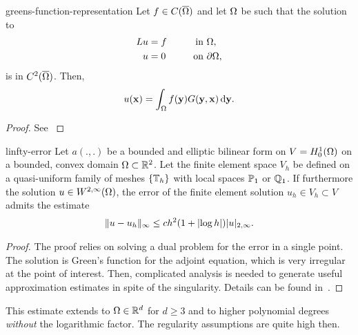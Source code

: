 \begin{Theorem}{greens-function-representation}
  Let $f\in C(\overline\domain)$ and let $\domain$ be such that the
  solution to
  \begin{gather}
    \begin{aligned}
      Lu &= f &\qquad\text{in }&\domain,\\
      u &= 0 &\text{on }&\d\domain,
    \end{aligned}
  \end{gather}
  is in $C^2(\overline\domain)$. Then,
  \begin{gather}
    u(\vx) = \int_\domain f(\vy)G(\vy,\vx)\dvy.
  \end{gather}
\end{Theorem}

\begin{proof}
  See \cite[Section 2.2]{Evans98}
\end{proof}

\begin{Theorem}{linfty-error}
  Let $a(.,.)$ be a bounded and elliptic bilinear form on
  $V = H^1_0(\domain)$ on a bounded, convex domain $\domain\subset \R^2$. Let the
  finite element space $V_h$ be defined on a quasi-uniform family of
  meshes $\{\mesh_h\}$ with local spaces $\P_1$ or $\Q_1$. If
  furthermore the solution $u\in W^{2,\infty}(\domain)$, the error of
  the finite element solution $u_h\in V_h \subset V$ admits the
  estimate
  \begin{gather}
    \norm{u-u_h}_{\infty} \le c h^{2} (1+\abs{\log h}) \snorm{u}_{2,\infty}.
  \end{gather}
\end{Theorem}

\begin{proof}
  The proof relies on solving a dual problem for the error in a single
  point. The solution is Green's function for the adjoint equation,
  which is very irregular at the point of interest. Then, complicated
  analysis is needed to generate useful approximation estimates in
  spite of the singularity. Details can be found
  in~\cite{SchatzWahlbin77,RannacherScott82}.
\end{proof}


\begin{remark}
  This estimate extends to $\domain\in\R^d$ for $d\ge 3$ and to higher
  polynomial degrees \emph{without} the logarithmic factor. The
  regularity assumptions are quite high then.
\end{remark}

